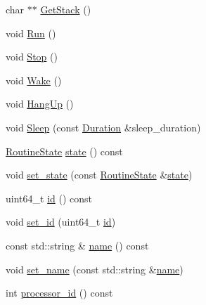 \begin{DoxyCompactItemize}
char $\ast$$\ast$ \hyperlink{classapollo_1_1cyber_1_1croutine_1_1CRoutine_a13151bd71806ca69ff7c13317ec9ff61}{Get\-Stack} ()
\item 
void \hyperlink{classapollo_1_1cyber_1_1croutine_1_1CRoutine_a194bf92eb5b29da955f41cfaa1c6f3d1}{Run} ()
\item 
void \hyperlink{classapollo_1_1cyber_1_1croutine_1_1CRoutine_acbf7f66f0ef56449837e02eb74a2feb3}{Stop} ()
\item 
void \hyperlink{classapollo_1_1cyber_1_1croutine_1_1CRoutine_aa2872097862baf607809ebe793f04920}{Wake} ()
\item 
void \hyperlink{classapollo_1_1cyber_1_1croutine_1_1CRoutine_a47ba7e433c0ca462eaafa87b78150c27}{Hang\-Up} ()
\item 
void \hyperlink{classapollo_1_1cyber_1_1croutine_1_1CRoutine_a7a7a609b9eea30ff016c79fd7e57b9e6}{Sleep} (const \hyperlink{namespaceapollo_1_1cyber_1_1croutine_aae31aee73e46be40ab635496b4d9d1e2}{Duration} \&sleep\-\_\-duration)
\item 
\hyperlink{namespaceapollo_1_1cyber_1_1croutine_a9b2ec600d9734ed2e857a7235cec5e48}{Routine\-State} \hyperlink{classapollo_1_1cyber_1_1croutine_1_1CRoutine_a457b30f1df6a1f3970b9e547bd6bb5e7}{state} () const 
\item 
void \hyperlink{classapollo_1_1cyber_1_1croutine_1_1CRoutine_a4e8b6724f43265bed0f7dba494e9edaa}{set\-\_\-state} (const \hyperlink{namespaceapollo_1_1cyber_1_1croutine_a9b2ec600d9734ed2e857a7235cec5e48}{Routine\-State} \&\hyperlink{classapollo_1_1cyber_1_1croutine_1_1CRoutine_a457b30f1df6a1f3970b9e547bd6bb5e7}{state})
\item 
uint64\-\_\-t \hyperlink{classapollo_1_1cyber_1_1croutine_1_1CRoutine_a4903bd33854f6b3e17d6be0b54c5109b}{id} () const 
\item 
void \hyperlink{classapollo_1_1cyber_1_1croutine_1_1CRoutine_a2551eee849d330a804bbf9216c2abf5d}{set\-\_\-id} (uint64\-\_\-t \hyperlink{classapollo_1_1cyber_1_1croutine_1_1CRoutine_a4903bd33854f6b3e17d6be0b54c5109b}{id})
\item 
const std\-::string \& \hyperlink{classapollo_1_1cyber_1_1croutine_1_1CRoutine_aa147ad950a110afa069542a1ca0a2386}{name} () const 
\item 
void \hyperlink{classapollo_1_1cyber_1_1croutine_1_1CRoutine_acc9e6fb1cab74150a16b145eec95b1df}{set\-\_\-name} (const std\-::string \&\hyperlink{classapollo_1_1cyber_1_1croutine_1_1CRoutine_aa147ad950a110afa069542a1ca0a2386}{name})
\item 
int \hyperlink{classapollo_1_1cyber_1_1croutine_1_1CRoutine_a3ef77a24e406fb936236856157e9a876}{processor\-\_\-id} () const 
$$
\end{DoxyCompactItemize}
